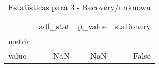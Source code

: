 \begin{table}[htbp]
\caption{Estatísticas para 3 - Recovery/unknown}
\label{tab:3_-_recovery_unknown_adf_test}
\begin{tabular}{lrrr}
\toprule
 & adf_stat & p_value & stationary \\
metric &  &  &  \\
\midrule
value & NaN & NaN & False \\
\bottomrule
\end{tabular}
\end{table}
